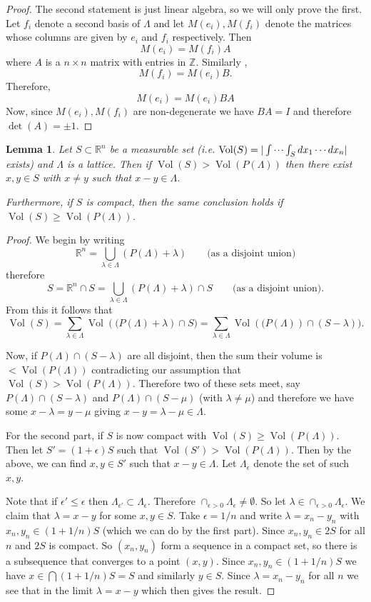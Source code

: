 \documentclass[11pt,a4paper]{report}
\theoremstyle{plain}
\newtheorem{lem}[subsection]{Lemma}
\theoremstyle{definition}
\theoremstyle{definition}
\newcommand{\ZZ}{\mathbb{Z}}
\newcommand{\RR}{\mathbb{R}}
\def \e {\epsilon}
\def \lam {\lambda}
\DeclareMathOperator{\Vol}{Vol}
\begin{document}
	\begin{proof}
		The second statement is just linear algebra, so we will only prove the first. Let $f_i$ denote a second basis of $\Lambda$ and let $M(e_i), M(f_i)$ denote the matrices whose columns are given by $e_i$ and $f_i$ respectively.  Then \[M(e_i)=M(f_i)A\] where $A$ is a $n \times n$ matrix with entries in $\ZZ$. Similarly , \[M(f_i)=M(e_i)B.\] Therefore, \[M(e_i)=M(e_i)BA\]  Now, since $M(e_i),M(f_i)$ are non-degenerate we have $BA=I$ and therefore $\det(A)=\pm 1$.
	\end{proof}
	
	\begin{lem}\label{lem: subset of Rn diff lem}
		Let $S \subset \RR^n$ be a measurable set (i.e. $\Vol(S)=|\idotsint_S dx_1\cdots dx_n|$ exists) and $\Lambda$ is a lattice. Then if\/ $\Vol(S) > \Vol(P(\Lambda))$ then there exist $x,y \in S$ with $x \neq y$ such that $x-y \in \Lambda$.
		
		Furthermore, if $S$ is compact, then the same conclusion holds if $\Vol(S) \geq \Vol(P(\Lambda))$.
	\end{lem}
	
	\begin{proof}
		We begin by writing \[\RR^n = \bigcup_{\lam \in \Lambda}  \left (P(\Lambda)+\lam \right )\qquad \text{(as a disjoint union)}\] therefore \[S= \RR^n \cap S= \bigcup_{\lam \in \Lambda}  \left (P(\Lambda)+\lam \right ) \cap S \qquad \text{(as a disjoint union)}. \] From this it follows that \[\Vol(S)=\sum_{\lam \in \Lambda}  \Vol \left ((P(\Lambda)+\lam \right ) \cap S) =\sum_{\lam \in \Lambda}  \Vol  \left ((P(\Lambda) \right ) \cap (S-\lam) ).  \]
		
		Now, if $P(\Lambda) \cap (S -\lam)$ are all disjoint, then the sum their volume is $< \Vol(P(\Lambda))$ contradicting  our assumption that $\Vol(S)> \Vol(P(\Lambda))$. Therefore two of these sets meet, say $P(\Lambda) \cap (S -\lam)$ and $P(\Lambda) \cap (S -\mu)$ (with $\lam \neq \mu$) and therefore we have some $x-\lam=y-\mu$ giving $x-y=\lam-\mu \in \Lambda$.
		
		
		For the second part, if $S$ is now compact with $\Vol(S) \geq \Vol(P(\Lambda))$. Then let $S'=(1+\e)S$ such that $\Vol(S')> \Vol(P(\Lambda))$. Then by the above, we can find $x,y \in S'$ such that $x-y \in \Lambda$. Let $\Lambda_\e$ denote the set of such $x,y$.
		
		Note that if $\e' \leq \e$ then $\Lambda_{\e'} \subset \Lambda_\e$. Therefore $\cap_{\e>0} \Lambda_\e \neq \emptyset$. So let $\lam \in \cap_{\e>0} \Lambda_\e$. We claim that $\lam=x-y$ for some $x,y \in S$. Take $\e=1/n$ and write $\lam=x_n-y_n$ with $x_n,y_n \in (1+1/n)S$ (which we can do by the first part). Since $x_n,y_n \in 2S$ for all $n$ and $2S$ is compact. So $(x_n,y_n)$ form a sequence in a compact set, so there is a subsequence that converges to a point $(x,y)$. Since $x_n,y_n \in (1+1/n)S$ we have $x \in \bigcap(1+1/n)S=S$ and similarly $y \in S$. Since $\lam=x_n-y_n$ for all $n$ we see that in the limit $\lam=x-y$ which then gives the result.
		
	\end{proof}
	
\end{document}
